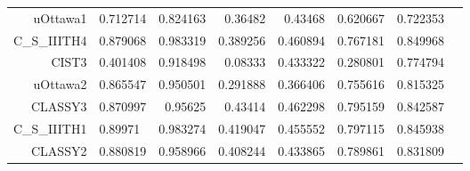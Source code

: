 \begin{table}[htbp]
\begin{tabular}{rlrrrrrr}
    uOttawa1 & 0.712714 & 0.824163 & 0.36482 & 0.43468 & 0.620667 & 0.722353 \\
    C\_S\_IIITH4 & 0.879068 & 0.983319 & 0.389256 & 0.460894 & 0.767181 & 0.849968 \\
    CIST3 & 0.401408 & 0.918498 & 0.08333 & 0.433322 & 0.280801 & 0.774794 \\
    uOttawa2 & 0.865547 & 0.950501 & 0.291888 & 0.366406 & 0.755616 & 0.815325 \\
    CLASSY3  & 0.870997 & 0.95625 & 0.43414 & 0.462298 & 0.795159 & 0.842587 \\
    C\_S\_IIITH1 & 0.89971 & 0.983274 & 0.419047 & 0.455552 & 0.797115 & 0.845938 \\
    CLASSY2 & 0.880819 & 0.958966 & 0.408244 & 0.433865 & 0.789861 & 0.831809 \\
    \hline
    \end{tabular}%
  \label{tab:addlabel}%
\end{table}%


